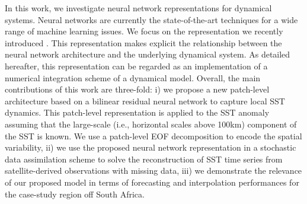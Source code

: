 \documentclass{article}
\begin{document}
In this work, we investigate neural network representations for dynamical systems. Neural networks are currently the state-of-the-art techniques for a wide range of machine learning issues. We focus on the representation we recently introduced \cite{fablet_bilinear_2017}. This representation makes explicit the relationship between the neural network architecture and the underlying dynamical system. As detailed hereafter, this representation can be regarded as an implementation of a numerical integration scheme of a dynamical model. Overall, the main contributions of this work are three-fold: i) we propose a new patch-level architecture based on a bilinear residual neural network to capture local SST dynamics. This patch-level representation is applied to the SST anomaly assuming that the large-scale (i.e., horizontal scales above 100km) component of the SST is known. We use a patch-level EOF decomposition to encode the spatial variability, ii) we use the proposed neural network representation in a stochastic data assimilation scheme to solve the reconstruction of SST time series from satellite-derived observations with missing data, iii) we demonstrate the relevance of our proposed model in terms of forecasting and interpolation performances for the case-study region off South Africa.




\end{document}
